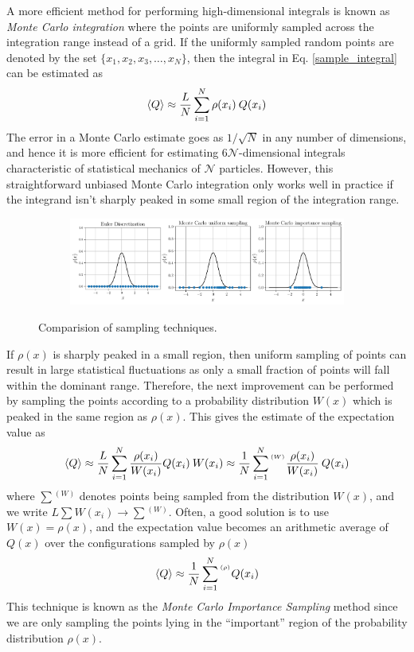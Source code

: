 \documentclass[../thesis_main.tex]{subfiles}
\begin{document}
A more efficient method for performing high-dimensional integrals is known as \textit{Monte Carlo integration} where the points are uniformly sampled across the integration range instead of a grid. If the uniformly sampled random points are denoted by the set $\{x_1, x_2, x_3, \ldots, x_N \}$, then the integral in Eq. \eqref{sample_integral} can be estimated as 
\begin{equation}
    \expval{Q} \approx \frac{L}{N} \sum_{i=1}^N \rho(x_i) \: Q(x_i)
\end{equation} 
The error in a Monte Carlo estimate goes as $1/\sqrt{N}$ in any number of dimensions, and hence it is more efficient for estimating $6 \mathcal{N}$-dimensional integrals characteristic of statistical mechanics of $\mathcal{N}$ particles. However, this straightforward unbiased Monte Carlo integration only works well in practice if the integrand isn't sharply peaked in some small region of the integration range.
\begin{figure}[!htb]
    \centering
    \begin{subfigure}[b]{1.0\textwidth}  %
        \centering
        \includegraphics[width=\textwidth]{images/monte_carlo/sampling.pdf}
    \end{subfigure}
    \caption{Comparision of sampling techniques.}
    \label{}
\end{figure}
\FloatBarrier \!\!\!\!\!\!\!\!\!\!\!
If $\rho(x)$ is sharply peaked in a small region, then uniform sampling of points can result in large statistical fluctuations as only a small fraction of points will fall within the dominant range. Therefore, the next improvement can be performed by sampling the points according to a probability distribution $W(x)$ which is peaked in the same region as $\rho(x)$. This gives the estimate of the expectation value as 
\begin{equation}
    \expval{Q} \approx \frac{L}{N} \sum_{i=1}^N \frac{\rho(x_i)}{W(x_i)} Q(x_i) \: W(x_i) \approx \frac{1}{N} \sum_{i=1}^N {}^{{}^{(W)}} \frac{\rho(x_i)}{W(x_i)} \: Q(x_i)
\end{equation}  
where $\sum {}^{(W)}$ denotes points being sampled from the distribution $W(x)$, and we write $L \sum W(x_i) \to \sum {{}^{(W)}}$. Often, a good solution is to use $W(x) = \rho(x)$, and the expectation value becomes an arithmetic average of $Q(x)$ over the configurations sampled by $\rho(x)$
\begin{equation}
    \expval{Q} \approx \frac{1}{N} \sum_{i=1}^N {}^{{}^{(\rho)}} Q(x_i)
\end{equation}
This technique is known as the \textit{Monte Carlo Importance Sampling} method since we are only sampling the points lying in the ``important'' region of the probability distribution $\rho(x)$.
\end{document}
